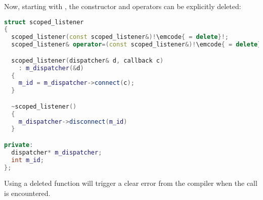Now, starting with , the constructor and operators can be
explicitly deleted:

\begin{lstlisting}[language=c++,escapechar=!]
struct scoped_listener
{
  scoped_listener(const scoped_listener&)!\emcode{ = delete}!;
  scoped_listener& operator=(const scoped_listener&)!\emcode{ = delete}!;

  scoped_listener(dispatcher& d, callback c)
    : m_dispatcher(&d)
  {
    m_id = m_dispatcher->connect(c);
  }

  ~scoped_listener()
  {
    m_dispatcher->disconnect(m_id)
  }

private:
  dispatcher* m_dispatcher;
  int m_id;
};
\end{lstlisting}

Using a deleted function will trigger a clear error from the compiler
when the call is encountered.

